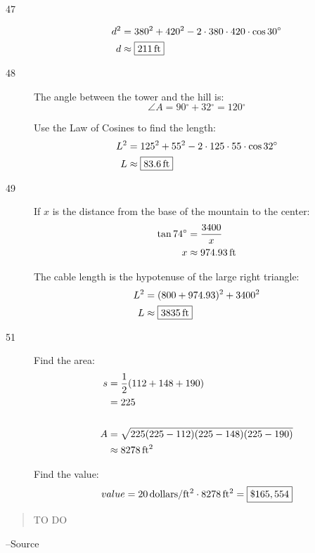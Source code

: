 \documentclass{exam}
\newcommand{\dg}{\ensuremath{^\circ}}
\begin{document}
\begin{description}
      \item[47]
        \begin{align*}
          d^2 & = 380^2 + 420^2 - 2 \cdot 380 \cdot 420 \cdot \cos 30 \dg \\
          d   & \approx \boxed{ \unit[211]{ft} } \\
        \end{align*}

      \item[48]
        The angle between the tower and the hill is:
        \[
          \angle A = 90 \dg + 32 \dg = 120 \dg
        \]

        Use the Law of Cosines to find the length:
        \begin{align*}
          L^2 & = 125^2 + 55^2 - 2 \cdot 125 \cdot 55 \cdot \cos 32 \dg \\
          L   & \approx \boxed{ \unit[83.6]{ft} } \\
        \end{align*}

      \pagebreak

      \item[49]
        If $x$ is the distance from the base of the mountain to the center:
        \begin{align*}
          \tan 74 \dg & = \frac{3400}{x} \\
          x           & \approx \unit[974.93]{ft} \\
        \end{align*}

        The cable length is the hypotenuse of the large right triangle:
        \begin{align*}
          L^2 &= (800 + 974.93)^2 + 3400^2 \\
          L &\approx \boxed{ \unit[3835]{ft} } \\
        \end{align*}

      \item[51]
        Find the area:
        \begin{align*}
          s & = \frac{1}{2} (112 + 148 + 190) \\
            & = 225 \\
          \\
          A & = \sqrt{225 (225 - 112)(225 - 148) (225 - 190)} \\
            & \approx \unit[8278]{ft^2} \\
        \end{align*}

        Find the value:
        \[
          value = \unit[20]{dollars/ft^2} \cdot \unit[8278]{ft^2} = \boxed{ \$165,554 }
        \]

    \end{description}

  \else
    \vspace{1 cm}
    \begin{quote}
      \begin{em}
        TO DO
      \end{em}
    \end{quote}
    \hspace{1 cm} --Source
  \fi
\end{document}
